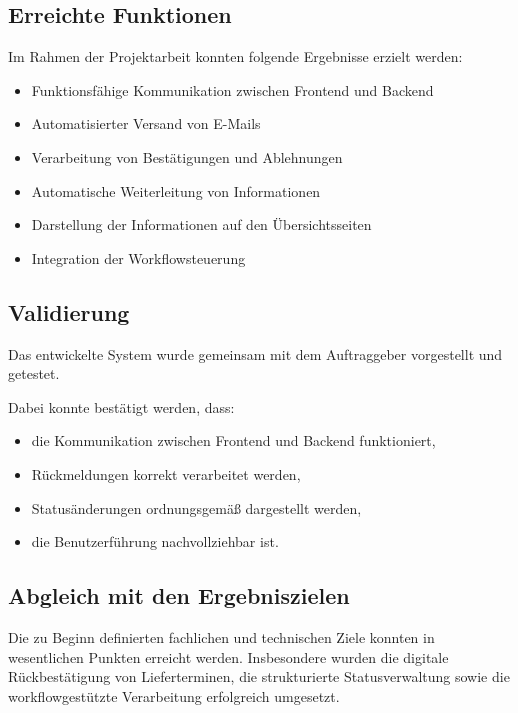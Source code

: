 \documentclass[
12pt,
a4paper
]{article}
\begin{document}
\subsection{Erreichte Funktionen}

Im Rahmen der Projektarbeit konnten folgende Ergebnisse erzielt
werden:

\begin{itemize}
    \item Funktionsfähige Kommunikation zwischen Frontend und Backend
    \item Automatisierter Versand von E-Mails
    \item Verarbeitung von Bestätigungen und Ablehnungen
    \item Automatische Weiterleitung von Informationen
    \item Darstellung der Informationen auf den Übersichtsseiten
    \item Integration der Workflowsteuerung
\end{itemize}

\subsection{Validierung}

Das entwickelte System wurde gemeinsam mit dem Auftraggeber
vorgestellt und getestet.

Dabei konnte bestätigt werden, dass:

\begin{itemize}
    \item die Kommunikation zwischen Frontend und Backend funktioniert,
    \item Rückmeldungen korrekt verarbeitet werden,
    \item Statusänderungen ordnungsgemäß dargestellt werden,
    \item die Benutzerführung nachvollziehbar ist.
\end{itemize}

\subsection{Abgleich mit den Ergebniszielen}

Die zu Beginn definierten fachlichen und technischen Ziele
konnten in wesentlichen Punkten erreicht werden. Insbesondere
wurden die digitale Rückbestätigung von Lieferterminen, die
strukturierte Statusverwaltung sowie die workflowgestützte
Verarbeitung erfolgreich umgesetzt.
\end{document}
